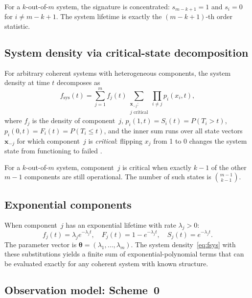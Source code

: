 \documentclass[12pt]{article}
\theoremstyle{definition}
\theoremstyle{remark}
\newcommand{\bthet}{\boldsymbol{\theta}}
\begin{document}
For a $k$-out-of-$m$ system, the signature is concentrated:
$s_{m-k+1} = 1$ and $s_i = 0$ for $i \ne m - k + 1$.  The system
lifetime is exactly the $(m-k+1)$-th order statistic.


\subsection{System density via critical-state decomposition}
\label{sec:density}

For arbitrary coherent systems with heterogeneous components,
the system density at time $t$ decomposes as
\begin{equation}
  \label{eq:fsys}
  f_{\mathrm{sys}}(t)
  = \sum_{j=1}^{m} f_j(t) \sum_{\substack{\mathbf{x}_{-j}:\\ j\text{ critical}}}
    \prod_{i \ne j} p_i(x_i, t),
\end{equation}
where $f_j$ is the density of component~$j$,
$p_i(1, t) = S_i(t) = P(T_i > t)$,
$p_i(0, t) = F_i(t) = P(T_i \le t)$,
and the inner sum runs over all state vectors $\mathbf{x}_{-j}$ for
which component~$j$ is \emph{critical}: flipping $x_j$ from 1 to 0
changes the system state from functioning to failed
\citep{BarlowProschan1975}.

For a $k$-out-of-$m$ system, component~$j$ is critical when exactly
$k - 1$ of the other $m - 1$ components are still operational.  The
number of such states is $\binom{m-1}{k-1}$.

\subsection{Exponential components}
\label{sec:exponential}

When component~$j$ has an exponential lifetime with rate
$\lambda_j > 0$:
\begin{equation}
  \label{eq:exp}
  f_j(t) = \lambda_j e^{-\lambda_j t}, \quad
  F_j(t) = 1 - e^{-\lambda_j t}, \quad
  S_j(t) = e^{-\lambda_j t}.
\end{equation}
The parameter vector is $\bthet = (\lambda_1, \ldots, \lambda_m)$.
The system density~\eqref{eq:fsys} with these substitutions yields a
finite sum of exponential-polynomial terms that can be evaluated
exactly for any coherent system with known structure.

\subsection{Observation model: Scheme~0}
\label{sec:scheme0}
\end{document}
